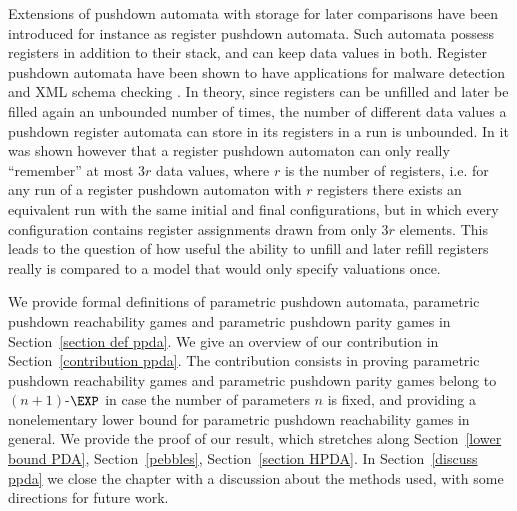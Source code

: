Extensions of pushdown automata with storage for later comparisons
have been introduced for instance as register pushdown automata. 
Such automata possess registers in addition to their stack, and can keep data values in both.
Register pushdown automata have been shown to have applications for malware detection and XML schema checking \cite{senda2021forward, senda2021ltl}. 
In theory, since registers can be unfilled and later be filled again an unbounded number of times, the number of different data values a pushdown register automata can store in its registers in a run is unbounded.  
In \cite{murawski2017reachability} it was shown however that a register pushdown automaton can
only really ``remember'' at most  $3r$ data values, where $r$ is the number of registers,
i.e. for any run of a register pushdown automaton with $r$ registers there exists an equivalent run %
 with the same initial and final conﬁgurations, but in which every configuration contains register assignments drawn from only $3r$ elements. This 
 leads to
 the
  question
  of
   how useful the ability to unfill and later refill registers really is compared to a model that would only specify valuations once.




We provide formal definitions of parametric pushdown automata, parametric pushdown reachability games
and parametric pushdown parity games in Section~\ref{section def ppda}. We give an overview of our contribution in Section~\ref{contribution ppda}. The contribution consists in
proving parametric pushdown reachability games
and parametric pushdown parity games belong to $(n+1)$-$\EXP$ in case the number of parameters
$n$ is fixed,
and providing a nonelementary lower bound for parametric pushdown reachability games in general.
We provide the proof of our result, which stretches along 
Section~\ref{lower bound PDA},
Section~\ref{pebbles},
Section~\ref{section HPDA}.
In Section~\ref{discuss ppda} we close the chapter with a discussion about the methods used, with some directions for future work.





